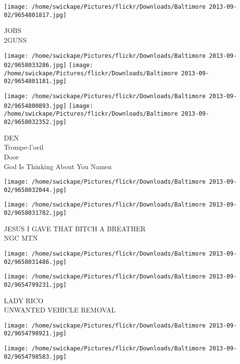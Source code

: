\documentclass[10pt,letterpaper]{article}
\begin{document}
\vspace{0.25in}
\texttt{[image: /home/swickape/Pictures/flickr/Downloads/Baltimore 2013-09-02/9654801817.jpg]}

JOBS\\
2GUNS\\
\pagebreak

\texttt{[image: /home/swickape/Pictures/flickr/Downloads/Baltimore 2013-09-02/9658033286.jpg]}
\texttt{[image: /home/swickape/Pictures/flickr/Downloads/Baltimore 2013-09-02/9654801181.jpg]}

\texttt{[image: /home/swickape/Pictures/flickr/Downloads/Baltimore 2013-09-02/9654800893.jpg]}
\texttt{[image: /home/swickape/Pictures/flickr/Downloads/Baltimore 2013-09-02/9658032352.jpg]}

DEN\\
Trompe{-}l'oeil\\
Door\\
God Is Thinking About You Namen\\
\pagebreak

\texttt{[image: /home/swickape/Pictures/flickr/Downloads/Baltimore 2013-09-02/9658032044.jpg]}

\vspace{0.25in}
\texttt{[image: /home/swickape/Pictures/flickr/Downloads/Baltimore 2013-09-02/9658031782.jpg]}

JESUS I GAVE THAT BITCH A BREATHER\\
NGC MTN\\
\pagebreak

\texttt{[image: /home/swickape/Pictures/flickr/Downloads/Baltimore 2013-09-02/9658031486.jpg]}

\vspace{0.25in}
\texttt{[image: /home/swickape/Pictures/flickr/Downloads/Baltimore 2013-09-02/9654799231.jpg]}

LADY RICO\\
UNWANTED VEHICLE REMOVAL\\
\pagebreak

\texttt{[image: /home/swickape/Pictures/flickr/Downloads/Baltimore 2013-09-02/9654798921.jpg]}

\vspace{0.25in}
\texttt{[image: /home/swickape/Pictures/flickr/Downloads/Baltimore 2013-09-02/9654798583.jpg]}
\end{document}
